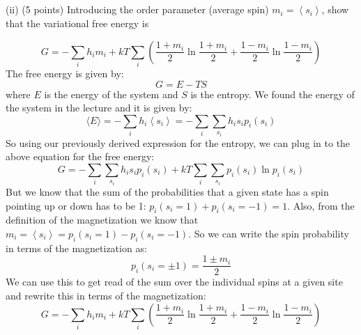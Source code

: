 \documentclass[12pt]{article}
\begin{document}
\subsection{}
(ii) (5 points) Introducing the order parameter (average spin) $m_{i}=\left\langle s_{i}\right\rangle$, show that the variational free energy is


\begin{equation*}
G=-\sum_{i} h_{i} m_{i}+k T \sum_{i}\left(\frac{1+m_{i}}{2} \ln \frac{1+m_{i}}{2}+\frac{1-m_{i}}{2} \ln \frac{1-m_{i}}{2}\right) \tag{2}
\end{equation*}
The free energy is given by:
\begin{equation}
G=E-TS
\end{equation}
where $E$ is the energy of the system and $S$ is the entropy. We found the energy of the system in the lecture and it is given by:
\begin{equation}
\langle E\rangle=-\sum_i h_i\left\langle s_i\right\rangle=-\sum_i \sum_{s_i} h_i s_i p_i\left(s_i\right)
\end{equation}
So using our previously derived expression for the entropy, we can plug in to the above equation for the free energy:
\begin{equation}
G=-\sum_i \sum_{s_i} h_i s_i p_i\left(s_i\right)+kT\sum_i \sum_{s_i} p_i\left(s_i\right) \ln p_i\left(s_i\right)
\end{equation}
But we know that the sum of the probabilities that a given state has a spin pointing up or down has to be 1: $p_i\left(s_i=1\right)+p_i\left(s_i=-1\right)=1$. Also, from the definition of the magnetization we know that $m_i=\left\langle s_i\right\rangle=p_i\left(s_i=1\right)-p_i\left(s_i=-1\right)$. So we can write the spin probability in terms of the magnetization as:
\begin{equation}
p_i\left(s_i=\pm1\right)=\frac{1\pm m_i}{2}
\end{equation}
We can use this to get read of the sum over the individual spins at a given site and rewrite this in terms of the magnetization:
\begin{equation}
G=-\sum_i h_i m_i+kT\sum_i \left(\frac{1+m_i}{2} \ln \frac{1+m_i}{2}+\frac{1-m_i}{2} \ln \frac{1-m_i}{2}\right)
\end{equation}
\subsection{}
\end{document}
